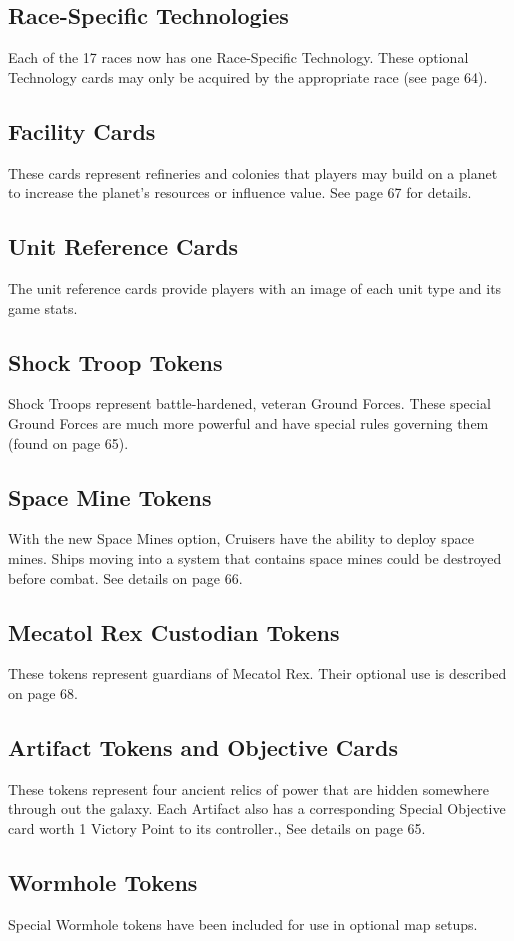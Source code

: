 \documentclass[11pt,fleqn]{book} %
\begin{document}
\begin{SEbox}    
\subsection{Race-Specific Technologies}

Each of the 17 races now has one Race-Specific Technology. These optional Technology cards may only be acquired by the appropriate race (see page 64). 

\subsection{Facility Cards}
These cards represent refineries and colonies that players may build on a planet to increase the planet’s resources or influence value. See page 67 for details.

\subsection{Unit Reference Cards}
The unit reference cards provide players with an image of each unit type and its game stats.

\subsection{Shock Troop Tokens}
Shock Troops represent battle-hardened, veteran Ground Forces. These special Ground Forces are much more powerful and have special rules governing them (found on page 65).

\subsection{Space Mine Tokens}
With the new Space Mines option, Cruisers have the ability to deploy space mines. Ships moving into a system that contains space mines could be destroyed before combat. See details on page 66.

\subsection{Mecatol Rex Custodian Tokens}
These tokens represent guardians of Mecatol Rex. Their optional use is described on page 68.

\subsection{Artifact Tokens and Objective Cards}
These tokens represent four ancient relics of power that are hidden somewhere through out the galaxy. Each Artifact also has a corresponding Special Objective card worth 1 Victory Point to its controller., See details on page 65.

\subsection{Wormhole Tokens}
Special Wormhole tokens have been included for use in optional map setups.

\end{SEbox}
\end{document}
